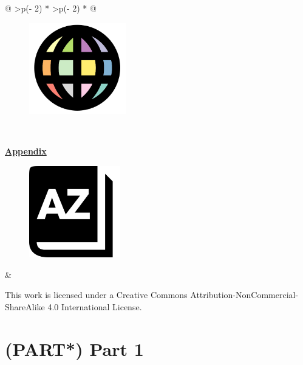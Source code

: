 \documentclass[
  letterpaper,
  DIV=11,
  numbers=noendperiod]{scrreprt}
\begin{document}
\begin{longtable}[]{@{}
  >{\centering\arraybackslash}p{(\columnwidth - 2\tabcolsep) * }
  >{\centering\arraybackslash}p{(\columnwidth - 2\tabcolsep) * }@{}}
\begin{minipage}[t]{\linewidth}
\begin{figure}
{\centering 

\protect\hyperlink{bfxlanguages}{\includegraphics[width=1.65625in,height=\textheight]{figures/languages.png}}

}

\end{figure}
\end{minipage} \\
\begin{minipage}[t]{\linewidth}\centering
\protect\hyperlink{cheatsheet}{\textbf{Appendix}}

\begin{figure}

{\centering 

\protect\hyperlink{cheatsheet}{\includegraphics[width=1.5625in,height=\textheight]{figures/cheatsheet.png}}

}

\end{figure}
\end{minipage} & \\
\end{longtable}

This work is licensed under a Creative Commons
Attribution-NonCommercial-ShareAlike 4.0 International License.


\hypertarget{part-part-1}{%
\chapter*{(PART*) Part 1}\label{part-part-1}}

\end{document}
